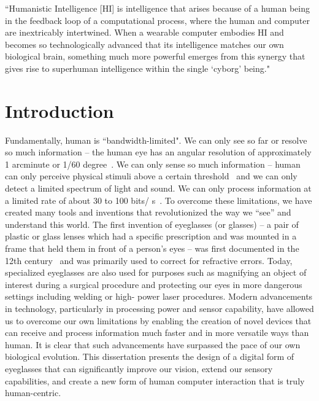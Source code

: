 \begin{savequote}[65mm]
``Humanistic Intelligence [HI] is intelligence that arises because of a human being in the feedback 
loop of a computational process, where the human and computer are inextricably intertwined. When a 
wearable computer embodies HI and becomes so technologically advanced that its intelligence 
matches our own biological brain, something much more powerful emerges from this synergy that 
gives rise to superhuman intelligence within the single `cyborg' being."
\end{savequote}

\chapter{Introduction}
Fundamentally, human is ``bandwidth-limited". We can only see so far or resolve so much information 
-- the human eye has an angular resolution of approximately 1 arcminute or 1/60 
degree~\cite{ophthalmology3rd}. We can only sense so much information -- human can only perceive 
physical stimuli above a certain threshold~\cite{laming1986weber} and we can only detect a limited 
spectrum of light and sound. We can only process information at a limited rate of about 30 to 100 bits/
s~\cite{martin2009thermodynamics}. To overcome these limitations, we have created many tools and 
inventions that revolutionized the way we ``see'' and understand this world. The first invention of 
eyeglasses (or glasses) -- a pair of plastic or glass lenses which had a specific prescription and was 
mounted in a frame that held them in front of a person's eyes -- was first documented in the 12th 
century~\cite{rosen1956invention} and was primarily used to correct for refractive errors. Today, 
specialized eyeglasses are also used for purposes such as magnifying an object of interest during a 
surgical procedure and protecting our eyes in more dangerous settings including welding or high-
power laser procedures. Modern advancements in technology, particularly in processing power and 
sensor capability, have allowed us to overcome our own limitations by enabling the creation of novel 
devices that can receive and process information much faster and in more versatile ways than human. 
It is clear that such advancements have surpassed the pace of our own biological evolution. This 
dissertation presents the design of a digital form of eyeglasses that can significantly improve our 
vision, extend our sensory capabilities, and create a new form of human computer interaction that is 
truly human-centric. 

